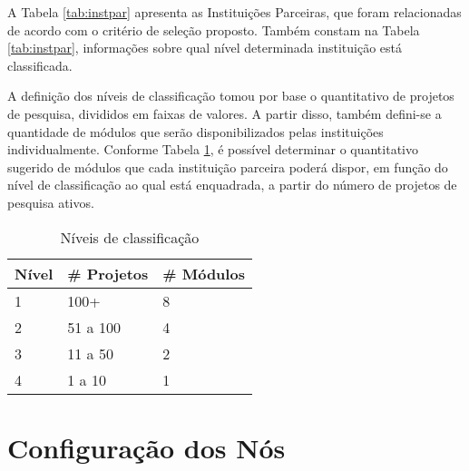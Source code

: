 \documentclass[tese,capa]{texufpel}
\begin{document}
A Tabela \ref{tab:instpar} apresenta as Instituições Parceiras, que foram relacionadas de acordo com o critério de seleção proposto. Também constam na Tabela \ref{tab:instpar}, informações sobre qual nível determinada instituição está classificada.

A definição dos níveis de classificação tomou por base o quantitativo de projetos de pesquisa, divididos em faixas de valores. A partir disso, também defini-se a quantidade de módulos que serão disponibilizados pelas instituições individualmente. Conforme Tabela \ref{tab:noporinst}, é possível determinar o quantitativo sugerido de módulos que cada instituição parceira poderá dispor, em função do nível de classificação ao qual está enquadrada, a partir do número de projetos de pesquisa ativos.

\begin{table}[H]
\centering
\caption{Níveis de classificação}
\label{tab:noporinst}
\begin{tabular}{@{}lll@{}}
\toprule
\textbf{Nível} & \textbf{\# Projetos} & \textbf{\# Módulos} \\ \midrule
1              & 100+                 & 8               \\
2              & 51 a 100             & 4               \\
3              & 11 a 50              & 2               \\
4              & 1 a 10               & 1               \\ \bottomrule
\end{tabular}
\end{table}


\section{Configuração dos Nós}\label{sec:confnos}
\end{document}

